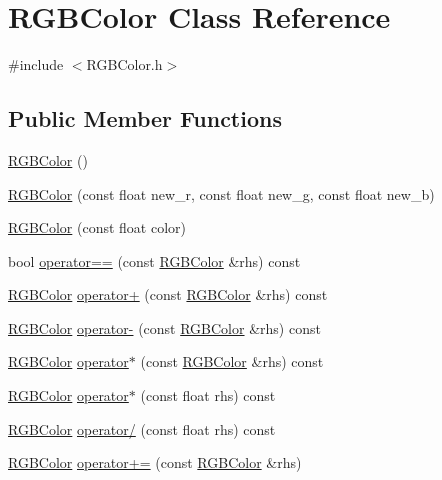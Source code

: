 \hypertarget{class_r_g_b_color}{}\section{R\+G\+B\+Color Class Reference}
\label{class_r_g_b_color}


{\ttfamily \#include $<$R\+G\+B\+Color.\+h$>$}

\subsection*{Public Member Functions}
\begin{DoxyCompactItemize}
\item 
\hyperlink{class_r_g_b_color_a9383ce7b63b0a6ada5d4e54e16adf733}{R\+G\+B\+Color} ()
\item 
\hyperlink{class_r_g_b_color_a941e8548a929710ac1dc3b77ff5428d0}{R\+G\+B\+Color} (const float new\+\_\+r, const float new\+\_\+g, const float new\+\_\+b)
\item 
\hyperlink{class_r_g_b_color_a64e01e409f0db2a46a9c413c81c89d67}{R\+G\+B\+Color} (const float color)
\item 
bool \hyperlink{group___utilities_ga51f2ca82bd3166f19e7327c8e5e5a068}{operator==} (const \hyperlink{class_r_g_b_color}{R\+G\+B\+Color} \&rhs) const
\item 
\hyperlink{class_r_g_b_color}{R\+G\+B\+Color} \hyperlink{group___utilities_gab8eb3021ce94a9a4fc7a1ba1e8c06a30}{operator+} (const \hyperlink{class_r_g_b_color}{R\+G\+B\+Color} \&rhs) const
\item 
\hyperlink{class_r_g_b_color}{R\+G\+B\+Color} \hyperlink{group___utilities_ga2d0a70444ca0c882f3a5dbed42787ef8}{operator-\/} (const \hyperlink{class_r_g_b_color}{R\+G\+B\+Color} \&rhs) const
\item 
\hyperlink{class_r_g_b_color}{R\+G\+B\+Color} \hyperlink{group___utilities_ga38cb49925dc77a366b56b546b7dd17ae}{operator$\ast$} (const \hyperlink{class_r_g_b_color}{R\+G\+B\+Color} \&rhs) const
\item 
\hyperlink{class_r_g_b_color}{R\+G\+B\+Color} \hyperlink{group___utilities_ga46707b8ca0c4b560914f2aae4ec31eb5}{operator$\ast$} (const float rhs) const
\item 
\hyperlink{class_r_g_b_color}{R\+G\+B\+Color} \hyperlink{group___utilities_ga932f5821d1c40799b6b40f2fe88b7070}{operator/} (const float rhs) const
\item 
\hyperlink{class_r_g_b_color}{R\+G\+B\+Color} \hyperlink{group___utilities_ga985586cc676498527d1597ab3beee728}{operator+=} (const \hyperlink{class_r_g_b_color}{R\+G\+B\+Color} \&rhs)

\end{DoxyCompactItemize}
